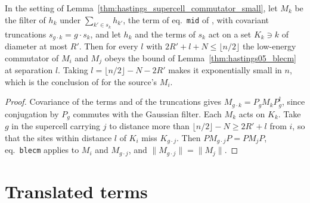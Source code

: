 \begin{theorem}
    \label{thm:hastings_supercell_truncated_small}
    \leanok
    In the setting of Lemma~\ref{thm:hastings_supercell_commutator_small}, let
    $M_k$ be the filter of $h_k$ under $\sum_{k'\in s_k}h_{k'}$, the term of
    eq.~\texttt{mid} of \cite[lines 285--307]{Hastings2006Solving}, with
    covariant truncations $s_{g\cdot k}=g\cdot s_k$, and let $h_k$ and the terms of
    $s_k$ act on a set $K_k\ni k$ of diameter at most $R'$. Then for every $l$
    with $2R'+l+N\le\lfloor n/2\rfloor$ the low-energy commutator of $M_i$ and
    $M_j$ obeys the bound of Lemma~\ref{thm:hastings05_blecm} at separation
    $l$. Taking $l=\lfloor n/2\rfloor-N-2R'$ makes it exponentially small in $n$,
    which is the conclusion of \cite[lines 1603--1641]{Hastings2006Solving} for
    the source's $M_i$.
\end{theorem}
\begin{proof}\leanok
    Covariance of the terms and of the truncations gives
    $M_{g\cdot k}=P_gM_kP_g^\dagger$, since conjugation by $P_g$ commutes with
    the Gaussian filter. Each $M_k$ acts on $K_k$. Take $g$ in the supercell
    carrying $j$ to distance more than $\lfloor n/2\rfloor-N\ge2R'+l$ from $i$, so
    that the sites within distance $l$ of $K_i$ miss $K_{g\cdot j}$. Then
    $PM_{g\cdot j}P=PM_jP$, eq.~\texttt{blecm} applies to $M_i$ and
    $M_{g\cdot j}$, and $\lVert M_{g\cdot j}\rVert=\lVert M_j\rVert$.
\end{proof}

\section{Translated terms}
\label{sec:translations_terms}

